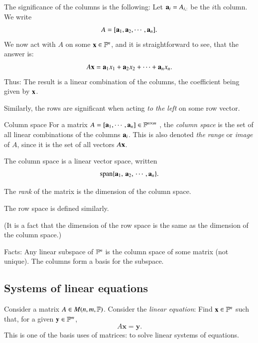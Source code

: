 The significance of the columns is the following: Let $\mathbf{a}_i = A_{i,:}$ be the $i$th column. We write
\[ A = [\mathbf{a}_1, \mathbf{a}_2, \cdots, \mathbf{a}_n]. \]
We now act with $A$ on some $\mathbf{x} \in \mathbb{F}^n$, and it is straightforward to see, that the answer is:
\begin{equation}
    A\mathbf{x} = \mathbf{a}_1 x_1 + \mathbf{a}_2 x_2 + \cdots + \mathbf{a}_n x_n.
\end{equation}
Thus: The result is a linear combination of the columns, the coefficient being given by $\mathbf{x}$.

Similarly, the rows are significant when acting \emph{to the left} on some row vector.


\begin{myDefinition}{Column space}{}
    For a matrix $A = [\mathbf{a}_1,\cdots,\mathbf{a}_n]\in\mathbb{F}^{n\times m}$ , the \emph{column space} is the set of all linear combinations of the columns $\mathbf{a}_i$. This is also denoted \emph{the range} or \emph{image} of $A$, since it is the set of all vectors $A\mathbf{x}$. 

    The column space is a linear vector space, written
    \begin{equation}
        \operatorname{span}\{ \mathbf{a}_1, \, \mathbf{a}_2, \, \cdots\, , \mathbf{a}_n \}.
    \end{equation}

    The \emph{rank} of the matrix is the dimension of the column space.

    The row space is defined similarly.

     (It is a fact that the dimension of the row space is the same as the dimension of the column space.)
\end{myDefinition}

Facts: Any linear subspace of $\mathbb{F}^n$ is the column space of some matrix (not unique). The columns form a basis for the subspace.



\subsection{Systems of linear equations}

Consider a matrix $A \in M(n,m,\mathbb{F})$. Consider the \emph{linear equation}: Find $\mathbf{x}\in \mathbb{F}^n$ such that, for a given $\mathbf{y}\in \mathbb{F}^m$,
\begin{equation}
    A \mathbf{x} = \mathbf{y}.
\end{equation}
This is one of the basis uses of matrices: to solve linear systems of equations.

